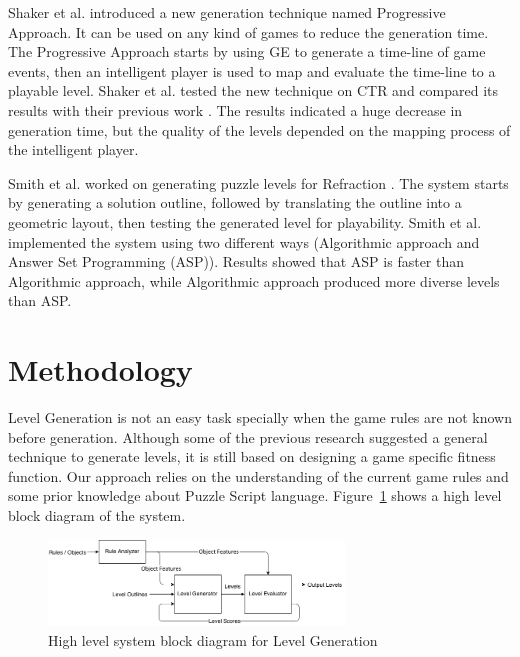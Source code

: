 \documentclass[letterpaper]{article}
\newcommand{\figref}[1]{Figure~\ref{Figure:#1}}
\begin{document}
Shaker et al. \cite{ctrProgressiveApproach} introduced a new generation technique named Progressive Approach. It can be used on any kind of games to reduce the generation time. The Progressive Approach starts by using GE to generate a time-line of game events, then an intelligent player is used to map and evaluate the time-line to a playable level. Shaker et al. tested the new technique on CTR and compared its results with their previous work \cite{ctrSimulationApproach}. The results indicated a huge decrease in generation time, but the quality of the levels depended on the mapping process of the intelligent player.\\\par

Smith et al. \cite{refractionStudy} worked on generating puzzle levels for Refraction \citeauthor{refraction}. The system starts by generating a solution outline, followed by translating the outline into a geometric layout, then testing the generated level for playability. Smith et al. implemented the system using two different ways (Algorithmic approach and Answer Set Programming (ASP)). Results showed that ASP is faster than Algorithmic approach, while Algorithmic approach produced more diverse levels than ASP.

\section{Methodology}
Level Generation is not an easy task specially when the game rules are not known before generation. Although some of the previous research suggested a general technique to generate levels, it is still based on designing a game specific fitness function. Our approach relies on the understanding of the current game rules and some prior knowledge about Puzzle Script language. \figref{levelGenBlockDiagram} shows a high level block diagram of the system.\\\par

\begin{figure}[ht]
  	\centering
    \includegraphics[width=0.7\textwidth]{Images/levelGenBlockDiagram}
    \caption{High level system block diagram for Level Generation}
    \label{Figure:levelGenBlockDiagram}
\end{figure}
\end{document}
